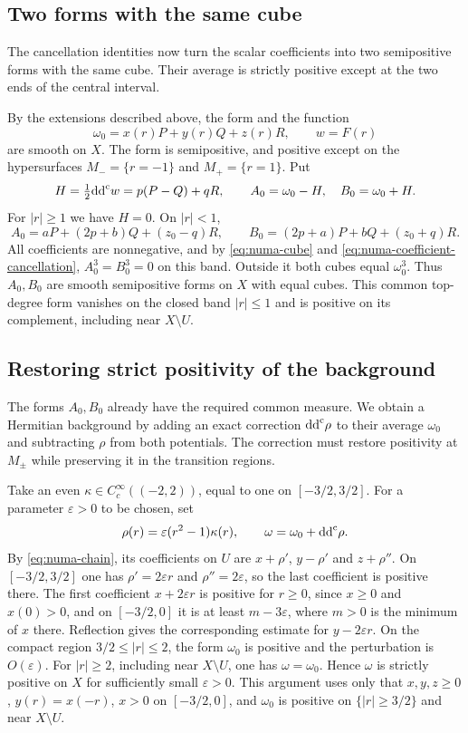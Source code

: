 \subsection{Two forms with the same cube}
\label{subsec:numa-equal-cubes}

The cancellation identities now turn the scalar coefficients into two semipositive forms with the same cube. Their average is strictly positive except at the two ends of the central interval.

By the extensions described above, the form and the function
\[
 \omega_0=x(r)P+y(r)Q+z(r)R,\qquad w=F(r)
\]
are smooth on $X$. The form is semipositive, and positive except on the hypersurfaces $M_- =\{r=-1\}$ and $M_+=\{r=1\}$. Put
\[
 H=\tfrac12\mathrm{dd}^{\mathrm{c}} w=p(P-Q)+qR,\qquad A_0=\omega_0-H,\quad B_0=\omega_0+H.
\]
For $|r|\geq1$ we have $H=0$. On $|r|<1$,
\[
 A_0=aP+(2p+b)Q+(z_0-q)R,\qquad
 B_0=(2p+a)P+bQ+(z_0+q)R.
\]
All coefficients are nonnegative, and by \eqref{eq:numa-cube} and \eqref{eq:numa-coefficient-cancellation}, $A_0^3=B_0^3=0$ on this band. Outside it both cubes equal $\omega_0^3$. Thus $A_0,B_0$ are smooth semipositive forms on $X$ with equal cubes. This common top-degree form vanishes on the closed band $|r|\leq1$ and is positive on its complement, including near $X\setminus U$.

\subsection{Restoring strict positivity of the background}
\label{subsec:numa-positive-background}

The forms $A_0,B_0$ already have the required common measure. We obtain a Hermitian background by adding an exact correction $\mathrm{dd}^{\mathrm{c}}\rho$ to their average $\omega_0$ and subtracting $\rho$ from both potentials. The correction must restore positivity at $M_\pm$ while preserving it in the transition regions.

Take an even $\kappa\in C_c^\infty((-2,2))$, equal to one on $[-3/2,3/2]$. For a parameter $\varepsilon>0$ to be chosen, set
\[
 \rho(r)=\varepsilon(r^2-1)\kappa(r),\qquad
 \omega=\omega_0+\mathrm{dd}^{\mathrm{c}}\rho.
\]
By \eqref{eq:numa-chain}, its coefficients on $U$ are $x+\rho'$, $y-\rho'$ and $z+\rho''$. On $[-3/2,3/2]$ one has $\rho'=2\varepsilon r$ and $\rho''=2\varepsilon$, so the last coefficient is positive there. The first coefficient $x+2\varepsilon r$ is positive for $r\geq0$, since $x\geq0$ and $x(0)>0$, and on $[-3/2,0]$ it is at least $m-3\varepsilon$, where $m>0$ is the minimum of $x$ there. Reflection gives the corresponding estimate for $y-2\varepsilon r$. On the compact region $3/2\leq|r|\leq2$, the form $\omega_0$ is positive and the perturbation is $O(\varepsilon)$. For $|r|\geq2$, including near $X\setminus U$, one has $\omega=\omega_0$. Hence $\omega$ is strictly positive on $X$ for sufficiently small $\varepsilon>0$. This argument uses only that $x,y,z\geq0$, $y(r)=x(-r)$, $x>0$ on $[-3/2,0]$, and $\omega_0$ is positive on $\{|r|\geq3/2\}$ and near $X\setminus U$.

